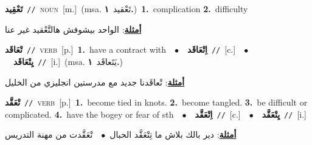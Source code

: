 \documentclass[10pt,a4paper,twoside]{article} %
\begin{document}
\begin{multicols}{2}
{\setlength\topsep{0pt}\textbf{\foreignlanguage{arabic}{تَعْقِيد}}\ {\color{gray}\texttt{//}\color{black}}\ \textsc{noun}\ [m.]\ \color{gray}(msa. \foreignlanguage{arabic}{تَعْقيد}~\foreignlanguage{arabic}{\textbf{١.}})\color{black}\ \textbf{1.}~complication  \textbf{2.}~difficulty\  \begin{flushright}\color{gray}\foreignlanguage{arabic}{\textbf{\underline{\foreignlanguage{arabic}{أمثلة}}}: الواحد بيشوفش هالتَّعْقيد غير عنا}\end{flushright}\color{black}} \vspace{2mm}

{\setlength\topsep{0pt}\textbf{\foreignlanguage{arabic}{تْعَاقَد}}\ {\color{gray}\texttt{//}\color{black}}\ \textsc{verb}\ [p.]\ \textbf{1.}~have a contract with\ \ $\bullet$\ \ \setlength\topsep{0pt}\textbf{\foreignlanguage{arabic}{اِتْعَاقَد}}\ {\color{gray}\texttt{//}\color{black}}\ [c.]\ \ $\bullet$\ \ \setlength\topsep{0pt}\textbf{\foreignlanguage{arabic}{يِتْعَاقَد}}\ {\color{gray}\texttt{//}\color{black}}\ [i.]\ \color{gray}(msa. \foreignlanguage{arabic}{يَتَعاقَد}~\foreignlanguage{arabic}{\textbf{١.}})\color{black}\  \begin{flushright}\color{gray}\foreignlanguage{arabic}{\textbf{\underline{\foreignlanguage{arabic}{أمثلة}}}: تْعاقَدنا جديد مع مدرستين انجليزي من الخليل}\end{flushright}\color{black}} \vspace{2mm}

{\setlength\topsep{0pt}\textbf{\foreignlanguage{arabic}{تْعَقَّد}}\ {\color{gray}\texttt{//}\color{black}}\ \textsc{verb}\ [p.]\ \textbf{1.}~become tied in knots.  \textbf{2.}~become tangled.  \textbf{3.}~be difficult or complicated.  \textbf{4.}~have the bogey or fear of sth\ \ $\bullet$\ \ \setlength\topsep{0pt}\textbf{\foreignlanguage{arabic}{اِتْعَقَّد}}\ {\color{gray}\texttt{//}\color{black}}\ [c.]\ \ $\bullet$\ \ \setlength\topsep{0pt}\textbf{\foreignlanguage{arabic}{يِتْعَقَّد}}\ {\color{gray}\texttt{//}\color{black}}\ [i.]\  \begin{flushright}\color{gray}\foreignlanguage{arabic}{\textbf{\underline{\foreignlanguage{arabic}{أمثلة}}}: دير بالك بلاش ما تِتْعَقَّد الحبال\ $\bullet$\ \  تْعَقَّدت من مهنة التدريس}\end{flushright}\color{black}} \vspace{2mm}


\end{multicols}
\end{document}
